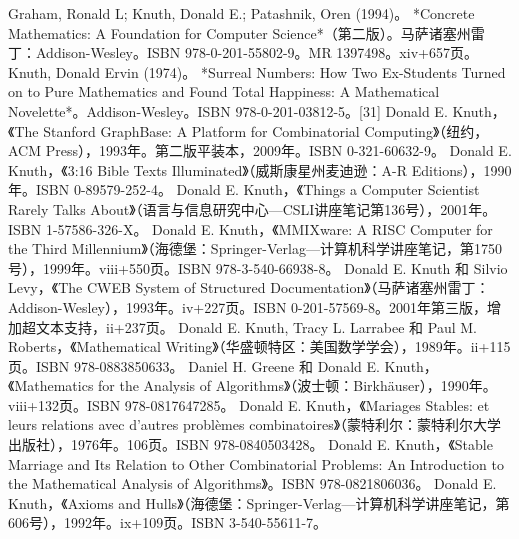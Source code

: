 Graham, Ronald L; Knuth, Donald E.; Patashnik, Oren (1994)。 *Concrete Mathematics: A Foundation for Computer Science*（第二版）。马萨诸塞州雷丁：Addison-Wesley。ISBN 978-0-201-55802-9。MR 1397498。xiv+657页。  
Knuth, Donald Ervin (1974)。 *Surreal Numbers: How Two Ex-Students Turned on to Pure Mathematics and Found Total Happiness: A Mathematical Novelette*。Addison-Wesley。ISBN 978-0-201-03812-5。[31]  
Donald E. Knuth，《The Stanford GraphBase: A Platform for Combinatorial Computing》（纽约，ACM Press），1993年。第二版平装本，2009年。ISBN 0-321-60632-9。  
Donald E. Knuth，《3:16 Bible Texts Illuminated》（威斯康星州麦迪逊：A-R Editions），1990年。ISBN 0-89579-252-4。  
Donald E. Knuth，《Things a Computer Scientist Rarely Talks About》（语言与信息研究中心—CSLI讲座笔记第136号），2001年。ISBN 1-57586-326-X。  
Donald E. Knuth，《MMIXware: A RISC Computer for the Third Millennium》（海德堡：Springer-Verlag—计算机科学讲座笔记，第1750号），1999年。viii+550页。ISBN 978-3-540-66938-8。  
Donald E. Knuth 和 Silvio Levy，《The CWEB System of Structured Documentation》（马萨诸塞州雷丁：Addison-Wesley），1993年。iv+227页。ISBN 0-201-57569-8。2001年第三版，增加超文本支持，ii+237页。  
Donald E. Knuth, Tracy L. Larrabee 和 Paul M. Roberts，《Mathematical Writing》（华盛顿特区：美国数学学会），1989年。ii+115页。ISBN 978-0883850633。  
Daniel H. Greene 和 Donald E. Knuth，《Mathematics for the Analysis of Algorithms》（波士顿：Birkhäuser），1990年。viii+132页。ISBN 978-0817647285。  
Donald E. Knuth，《Mariages Stables: et leurs relations avec d'autres problèmes combinatoires》（蒙特利尔：蒙特利尔大学出版社），1976年。106页。ISBN 978-0840503428。  
Donald E. Knuth，《Stable Marriage and Its Relation to Other Combinatorial Problems: An Introduction to the Mathematical Analysis of Algorithms》。ISBN 978-0821806036。  
Donald E. Knuth，《Axioms and Hulls》（海德堡：Springer-Verlag—计算机科学讲座笔记，第606号），1992年。ix+109页。ISBN 3-540-55611-7。
